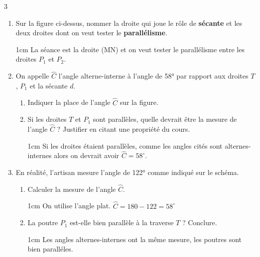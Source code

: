 \documentclass[a4paper]{book}
\begin{document}
{\begin{exerciceNote}{3}
        \begin{enumerate}[leftmargin=*]
            \item Sur la figure ci-dessus, nommer la droite qui joue le rôle de \textbf{sécante} et les deux droites dont on veut tester le \textbf{parallélisme}.
            
            \begin{ZoneReponse}{1cm}
                La séance est la droite (MN) et on veut tester le parallélisme entre les droites $P_1$ et $P_2$.
            \end{ZoneReponse}
            
            \item On appelle $\widehat{C}$ l'angle alterne-interne à l'angle de 58° par rapport aux droites $T$, $P_1$ et la sécante $d$. 

            \begin{enumerate}[leftmargin=*]
                \item Indiquer la place de l'angle $\widehat{C}$ sur la figure.

                \item Si les droites $T$ et $P_1$ sont parallèles, quelle devrait être la mesure de l'angle $\widehat{C}$ ? Justifier en citant une propriété du cours.

                \begin{ZoneReponse}{1cm}
                    Si les droites étaient parallèles, comme les angles cités sont alternes-internes alors on devrait avoir $\widehat{C}=58^\circ$.
                \end{ZoneReponse}
            \end{enumerate}    
  
            \item En réalité, l'artisan mesure l'angle de 122° comme indiqué sur le schéma.
            \begin{enumerate}[leftmargin=*]
                \item Calculer la mesure de l'angle $\widehat{C}$.

                \begin{ZoneReponse}{1cm}
                    On utilise l'angle plat. $\widehat{C}=180-122=58^\circ$
                \end{ZoneReponse}
                
                \item La poutre $P_1$ est-elle bien parallèle à la traverse $T$ ? Conclure.

                \begin{ZoneReponse}{1cm}
                    Les angles alternes-internes ont la même mesure, les poutres sont bien paralléles.
                \end{ZoneReponse}
            \end{enumerate}
        \end{enumerate}
    \end{exerciceNote}

}
\end{document}
